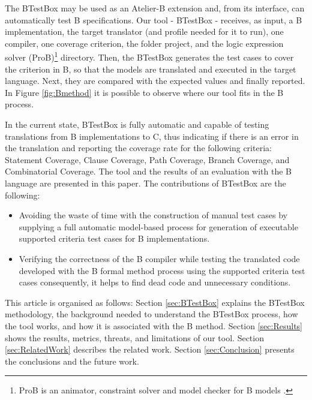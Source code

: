 \documentclass[runningheads]{llncs}
\begin{document}
The BTestBox may be used as an Atelier-B extension and, from its interface, can automatically test B specifications. Our tool - BTestBox - receives, as input, a B implementation, the target translator (and profile needed for it to run), one compiler, one coverage criterion, the folder project, and the logic expression solver (ProB)\footnote{ProB is an animator, constraint solver and model checker for B models \cite{1_leuschel_2017}.} directory. Then, the BTestBox generates the test cases to cover the criterion in B, so that the models are translated and executed in the target language. Next, they are compared with the expected values and finally reported. In Figure \ref{fig:Bmethod} it is possible to observe where our tool fits in the B process.

In the current state, BTestBox is fully automatic and capable of testing translations from B implementations to C, thus indicating if there is an error in the translation and reporting the coverage rate for the following criteria: Statement Coverage, Clause Coverage, Path Coverage, Branch Coverage, and Combinatorial Coverage. 
The tool and the results of an evaluation with the B language are presented in this paper. The contributions of BTestBox are the following:




\begin{itemize}
    \item Avoiding the waste of time with the construction of manual test cases by supplying a full automatic model-based process for generation of executable supported criteria test cases for B implementations.%
    \item Verifying the correctness of the B compiler while testing the translated code developed with the B formal method process using the supported criteria test cases consequently, it helps to find dead code and unnecessary conditions.
\end{itemize}

This article is organised as follows: %
Section \ref{sec:BTestBox} explains the BTestBox methodology, the background needed to understand the BTestBox process, how the tool works, and how it is associated with the B method. Section \ref{sec:Results} shows the results, metrics, threats, and limitations of our tool. Section \ref{sec:RelatedWork} describes the related work. Section \ref{sec:Conclusion} presents the conclusions and the future work.
\end{document}

